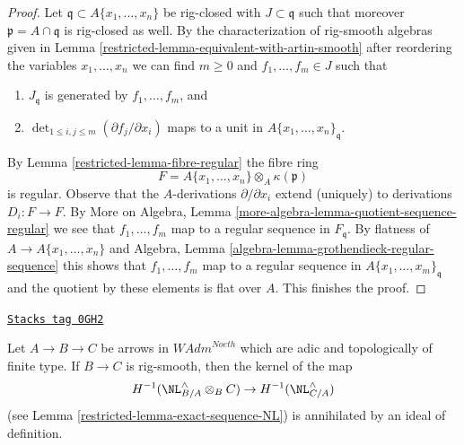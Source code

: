 \begin{proof}
\medskip\noindent
Let $\mathfrak q \subset A\{x_1, \ldots, x_n\}$ be rig-closed with
$J \subset \mathfrak q$ such that moreover $\mathfrak p = A \cap \mathfrak q$
is rig-closed as well. By the characterization of rig-smooth algebras
given in Lemma \ref{restricted-lemma-equivalent-with-artin-smooth}
after reordering the variables $x_1, \ldots, x_n$
we can find $m \geq 0$ and $f_1, \ldots, f_m \in J$ such that
\begin{enumerate}
\item $J_\mathfrak q$ is generated by $f_1, \ldots, f_m$, and
\item $\det_{1 \leq i, j \leq m}(\partial f_j/ \partial x_i)$
maps to a unit in $A\{x_1, \ldots, x_n\}_\mathfrak q$.
\end{enumerate}
By Lemma \ref{restricted-lemma-fibre-regular} the fibre ring
$$
F = A\{x_1, \ldots, x_n\} \otimes_A \kappa(\mathfrak p)
$$
is regular. Observe that the $A$-derivations $\partial / \partial x_i$
extend (uniquely) to derivations $D_i : F \to F$. By
More on Algebra, Lemma \ref{more-algebra-lemma-quotient-sequence-regular}
we see that $f_1, \ldots, f_m$ map to a regular sequence in
$F_\mathfrak q$. By flatness of $A \to A\{x_1, \ldots, x_n\}$
and Algebra, Lemma \ref{algebra-lemma-grothendieck-regular-sequence}
this shows that $f_1, \ldots, f_m$ map to a regular sequence in
$A\{x_1, \ldots, x_m\}_\mathfrak q$ and the quotient by
these elements is flat over $A$. This finishes the proof.
\end{proof}

\begin{lemma}
\label{restricted-lemma-exact-sequence-NL-rig-smooth}
\href{https://stacks.math.columbia.edu/tag/0GH2}{\texttt{Stacks tag 0GH2}}

Let $A \to B \to C$ be arrows in $\textit{WAdm}^{Noeth}$
which are adic and topologically of finite type. If $B \to C$
is rig-smooth, then the kernel of the map
$$
H^{-1}(\NL_{B/A}^\wedge \otimes_B C) \to H^{-1}(\NL_{C/A}^\wedge)
$$
(see Lemma \ref{restricted-lemma-exact-sequence-NL})
is annihilated by an ideal of definition.
\end{lemma}

